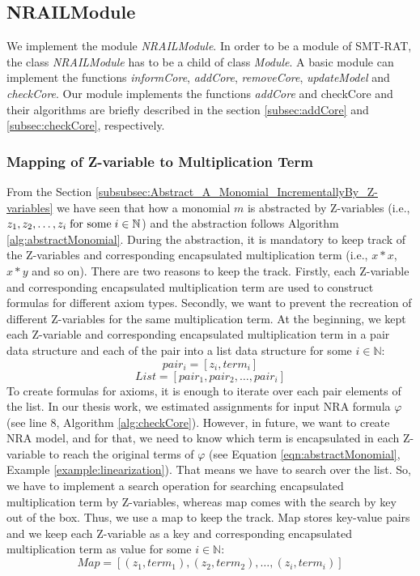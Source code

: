 \subsection{NRAILModule}
\label{subsec:nrailmodule}
We implement the module \textit{NRAILModule}.
In order to be a module of SMT-RAT, the class \textit{NRAILModule} has to be a child of class \textit{Module}.
A basic module can implement the functions \textit{informCore}, \textit{addCore}, \textit{removeCore}, \textit{updateModel} and \textit{checkCore}.
Our module implements the functions \textit{addCore} and {checkCore} and their algorithms are briefly described in the section \ref{subsec:addCore} and \ref{subsec:checkCore}, respectively.\newline


\subsubsection{Mapping of Z-variable to Multiplication Term}
\label{subsubsec:Mapping_of_Z-variable_to_Multiplication_Term}
From the Section \ref{subsubsec:Abstract_A_Monomial_IncrementallyBy_Z-variables} we have seen that how a monomial $m$ is abstracted by Z-variables (i.e., $z_1, z_2,\dots, z_i \hspace{1mm}\text{for some}\hspace{1mm} i \in \mathbb{N}$) and the abstraction follows Algorithm \ref{alg:abstractMonomial}.
During the abstraction, it is mandatory to keep track of the Z-variables and corresponding encapsulated multiplication term (i.e., $x \ast x$, $x \ast y$ and so on).
There are two reasons to keep the track.
Firstly, each Z-variable and corresponding encapsulated multiplication term are used to construct formulas for different axiom types.
Secondly, we want to prevent the recreation of different Z-variables for the same multiplication term.
At the beginning, we kept each Z-variable and corresponding encapsulated multiplication term in a pair data structure and each of the pair into a list data structure for some $i \in \mathbb{N}$:
$$pair_{i} = [z_{i}, term_{i}]$$
$$List = [pair_{1}, pair_{2}, \dots, pair_{i}]$$
To create formulas for axioms, it is enough to iterate over each pair elements of the list.
In our thesis work, we estimated assignments for input NRA formula $\varphi$ (see line $8$, Algorithm \ref{alg:checkCore}).
However, in future, we want to create NRA model, and for that, we need to know which term is encapsulated in each Z-variable to reach the original terms of $\varphi$ (see Equation \ref{eqn:abstractMonomial}, Example \ref{example:linearization}).
That means we have to search over the list.
So, we have to implement a search operation for searching encapsulated multiplication term by Z-variables, whereas map comes with the search by key out of the box.
Thus, we use a map to keep the track.
Map stores key-value pairs and we keep each Z-variable as a key and corresponding encapsulated multiplication term as value for some $i \in \mathbb{N}$:
$$Map = [(z_{1}, term_{1}), (z_{2}, term_{2}), \dots, (z_{i}, term_{i})]$$

